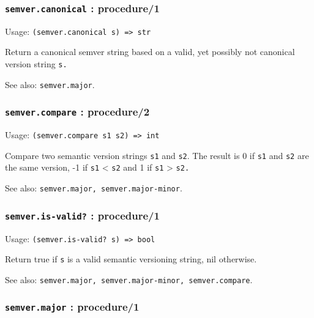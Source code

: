 \documentclass[
]{article}
\newcommand{\passthrough}[1]{#1}
\begin{document}
\hypertarget{semver.canonical-procedure1}{%
\subsubsection{\texorpdfstring{\texttt{semver.canonical} :
procedure/1}{semver.canonical : procedure/1}}\label{semver.canonical-procedure1}}

Usage: \passthrough{\lstinline!(semver.canonical s) => str!}

Return a canonical semver string based on a valid, yet possibly not
canonical version string \passthrough{\lstinline!s.!}

See also: \passthrough{\lstinline!semver.major!}.

\hypertarget{semver.compare-procedure2}{%
\subsubsection{\texorpdfstring{\texttt{semver.compare} :
procedure/2}{semver.compare : procedure/2}}\label{semver.compare-procedure2}}

Usage: \passthrough{\lstinline!(semver.compare s1 s2) => int!}

Compare two semantic version strings \passthrough{\lstinline!s1!} and
\passthrough{\lstinline!s2!}. The result is 0 if
\passthrough{\lstinline!s1!} and \passthrough{\lstinline!s2!} are the
same version, -1 if \passthrough{\lstinline!s1!} \textless{}
\passthrough{\lstinline!s2!} and 1 if \passthrough{\lstinline!s1!}
\textgreater{} \passthrough{\lstinline!s2.!}

See also: \passthrough{\lstinline!semver.major, semver.major-minor!}.

\hypertarget{semver.is-valid-procedure1}{%
\subsubsection{\texorpdfstring{\texttt{semver.is-valid?} :
procedure/1}{semver.is-valid? : procedure/1}}\label{semver.is-valid-procedure1}}

Usage: \passthrough{\lstinline!(semver.is-valid? s) => bool!}

Return true if \passthrough{\lstinline!s!} is a valid semantic
versioning string, nil otherwise.

See also:
\passthrough{\lstinline!semver.major, semver.major-minor, semver.compare!}.

\hypertarget{semver.major-procedure1}{%
\subsubsection{\texorpdfstring{\texttt{semver.major} :
procedure/1}{semver.major : procedure/1}}\label{semver.major-procedure1}}
\end{document}
